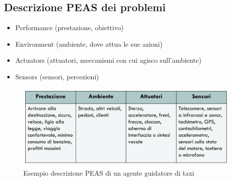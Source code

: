 \documentclass{article}
\begin{document}
\subsection{Descrizione PEAS dei problemi}
\begin{itemize}
    \item Performance (prestazione, obiettivo)
    \item Environment (ambiente, dove attua le sue azioni)
    \item Actuators (attuatori, meccanismi con cui agisco sull'ambiente)
    \item Sensors (sensori, percezioni)
\end{itemize}
\begin{figure}[H]
    \centering
    \includegraphics[scale=0.4]{Images/esempioPEAS.png}
    \caption{Esempio descrizione PEAS di un agente guidatore di taxi}
\end{figure}
\clearpage
\end{document}
